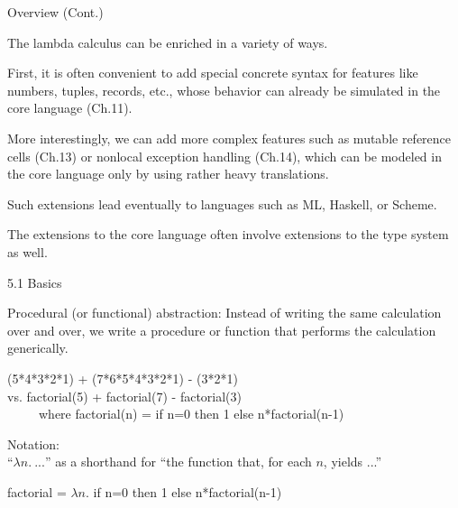 \documentclass[table]{beamer}
\begin{document}
\begin{frame}[t]{Overview (Cont.)} \vspace{10pt}

The lambda calculus can be enriched in a variety of ways.

\vspace{10pt}

First, it is often convenient to add special concrete syntax for features like numbers, tuples, records, etc., whose behavior can already be simulated in the core language (Ch.11). 

\vspace{10pt}

More interestingly, we can add more complex features such as mutable reference cells (Ch.13) or nonlocal exception handling (Ch.14), which can be modeled in the core language only by using rather heavy translations.

\vspace{10pt}

Such extensions lead eventually to languages such as ML, Haskell, or Scheme. 

\vspace{10pt}

The extensions to the core language often involve extensions to the type system as well.  

\end{frame}


\begin{frame}[t]{5.1 Basics} \vspace{10pt}

Procedural (or functional) abstraction: Instead of writing the same calculation over and over, we write a procedure or function that performs the calculation generically.

\vspace{10pt}

(5*4*3*2*1) + (7*6*5*4*3*2*1) - (3*2*1) \\
vs. 
factorial(5) + factorial(7) - factorial(3) \\
\ \ \ \ \ where factorial(n) = if n=0 then 1 else n*factorial(n-1)

\vspace{10pt}

Notation: \\
``$\lambda n. \ ...$'' as a shorthand for ``the function that, for each $n$, yields ...''

\vspace{10pt}

factorial = $\lambda n$. if n=0 then 1 else n*factorial(n-1)

\end{frame}
\end{document}
